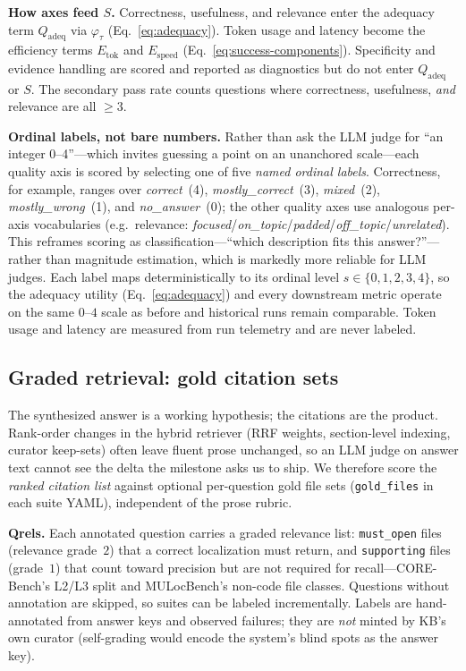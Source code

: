\medskip
\noindent\textbf{How axes feed $S$.}
Correctness, usefulness, and relevance enter the adequacy term
$Q_{\text{adeq}}$ via $\varphi_\tau$ (Eq.~\ref{eq:adequacy}).
Token usage and latency become the efficiency terms $E_{\text{tok}}$ and
$E_{\text{speed}}$ (Eq.~\ref{eq:success-components}).
Specificity and evidence handling are scored and reported as diagnostics but
do not enter $Q_{\text{adeq}}$ or $S$.
The secondary pass rate counts questions where correctness, usefulness,
\emph{and} relevance are all $\geq 3$.

\medskip
\noindent\textbf{Ordinal labels, not bare numbers.}  Rather than ask the LLM
judge for ``an integer 0--4''---which invites guessing a point on an unanchored
scale---each quality axis is scored by selecting one of five \emph{named ordinal labels}.
Correctness, for example, ranges over
\textit{correct}~(4), \textit{mostly\_correct}~(3), \textit{mixed}~(2),
\textit{mostly\_wrong}~(1), and \textit{no\_answer}~(0); the other quality axes use
analogous per-axis vocabularies (e.g.\ relevance:
\textit{focused}/\textit{on\_topic}/\textit{padded}/\textit{off\_topic}/\textit{unrelated}).
This reframes scoring as classification---``which description fits this answer?''---rather
than magnitude estimation, which is markedly more reliable for LLM judges.  Each
label maps deterministically to its ordinal level $s \in \{0,1,2,3,4\}$, so the
adequacy utility (Eq.~\ref{eq:adequacy}) and every downstream metric operate on the
same $0$--$4$ scale as before and historical runs remain comparable.
Token usage and latency are measured from run telemetry and are never labeled.

\subsection{Graded retrieval: gold citation sets}
\label{subsec:graded-retrieval}

The synthesized answer is a working hypothesis; the citations are the product.
Rank-order changes in the hybrid retriever (RRF weights, section-level indexing,
curator keep-sets) often leave fluent prose unchanged, so an LLM judge on answer
text cannot see the delta the milestone asks us to ship.  We therefore score the
\emph{ranked citation list} against optional per-question gold file sets
(\texttt{gold\_files} in each suite YAML), independent of the prose rubric.

\medskip
\noindent\textbf{Qrels.}  Each annotated question carries a graded relevance list:
\texttt{must\_open} files (relevance grade~$2$) that a correct localization must
return, and \texttt{supporting} files (grade~$1$) that count toward precision but
are not required for recall---CORE-Bench's L2/L3 split and MULocBench's non-code
file classes.  Questions without annotation are skipped, so suites can be labeled
incrementally.  Labels are hand-annotated from answer keys and observed failures;
they are \emph{not} minted by KB's own curator (self-grading would encode the
system's blind spots as the answer key).

